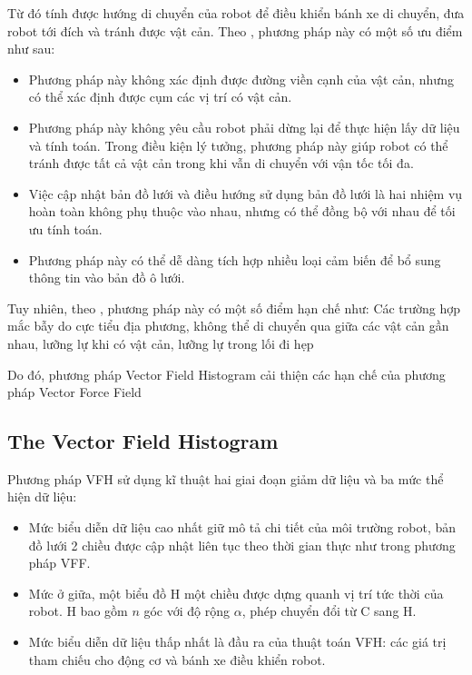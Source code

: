 Từ đó tính được hướng di chuyển của robot để điều khiển bánh xe di chuyển, đưa robot tới đích và tránh được vật cản. Theo \cite{Borenstein1988}, phương pháp này có một số ưu điểm như sau:
\begin{itemize}
  \item Phương pháp này không xác định được đường viền cạnh của vật cản, nhưng có thể xác định được cụm các vị trí có vật cản.
  \item Phương pháp này không yêu cầu robot phải dừng lại để thực hiện lấy dữ liệu và tính toán. Trong điều kiện lý tưởng, phương pháp này giúp robot có thể tránh được tất cả vật cản trong khi vẫn di chuyển với vận tốc tối đa.
  \item Việc cập nhật bản đồ lưới và điều hướng sử dụng bản đồ lưới là hai nhiệm vụ hoàn toàn không phụ thuộc vào nhau, nhưng có thể đồng bộ với nhau để tối ưu tính toán. 
  \item Phương pháp này có thể dễ dàng tích hợp nhiều loại cảm biến để bổ sung thông tin vào bản đồ ô lưới. 
\end{itemize}

Tuy nhiên, theo \cite{Koren1991}, phương pháp này có một số điểm hạn chế như: Các trường hợp mắc bẫy do cực tiểu địa phương, không thể di chuyển qua giữa các vật cản gần nhau, lưỡng lự khi có vật cản, lưỡng lự trong lối đi hẹp

Do đó, phương pháp Vector Field Histogram cải thiện các hạn chế của phương pháp Vector Force Field

\subsection{The Vector Field Histogram}
\label{sub:VFH}
Phương pháp VFH \cite{Borenstein1991} sử dụng kĩ thuật hai giai đoạn giảm dữ liệu và ba mức thể hiện dữ liệu:

\begin{itemize}
  \item Mức biểu diễn dữ liệu cao nhất giữ mô tả chi tiết của môi trường robot, bản đồ lưới 2 chiều được cập nhật liên tục theo thời gian thực như trong phương pháp VFF. 
  \item Mức ở giữa, một biểu đồ H một chiều được dựng quanh vị trí tức thời của robot. H bao gồm $n$ góc với độ rộng $\alpha$, phép chuyển đổi từ C sang H. 
  \item Mức biểu diễn dữ liệu thấp nhất là đầu ra của thuật toán VFH: các giá trị tham chiếu cho động cơ và bánh xe điều khiển robot. 
\end{itemize}

